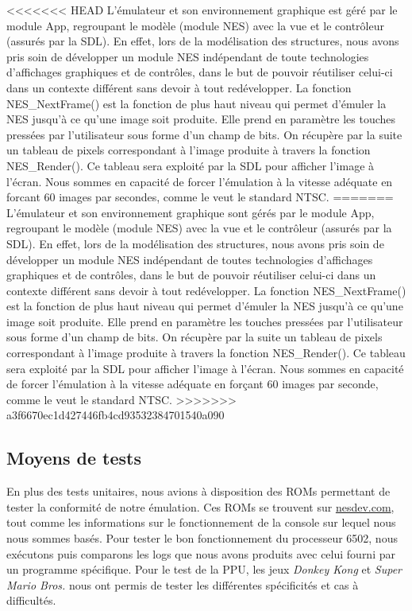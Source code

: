 <<<<<<< HEAD
L’émulateur et son environnement graphique est géré par le module App, regroupant le modèle (module NES) avec la vue et le contrôleur (assurés par la SDL). En effet, lors de la modélisation des structures, nous avons pris soin de développer un module NES indépendant de toute technologies d'affichages graphiques et de contrôles, dans le but de pouvoir réutiliser celui-ci dans un contexte différent sans devoir à tout redévelopper. La fonction NES\_NextFrame() est la fonction de plus haut niveau qui permet d'émuler la NES jusqu’à ce qu'une image soit produite. Elle prend en paramètre les touches pressées par l'utilisateur sous forme d'un champ de bits. On récupère par la suite un tableau de pixels correspondant à l'image produite à travers la fonction NES\_Render(). Ce tableau sera exploité par la SDL pour afficher l'image à l'écran. Nous sommes en capacité de forcer l'émulation à la vitesse adéquate en forcant 60 images par secondes, comme le veut le standard NTSC.
=======
L’émulateur et son environnement graphique sont gérés par le module App, regroupant le modèle (module NES) avec la vue et le contrôleur (assurés par la SDL). En effet, lors de la modélisation des structures, nous avons pris soin de développer un module NES indépendant de toutes technologies d'affichages graphiques et de contrôles, dans le but de pouvoir réutiliser celui-ci dans un contexte différent sans devoir à tout redévelopper. La fonction NES\_NextFrame() est la fonction de plus haut niveau qui permet d'émuler la NES jusqu’à ce qu'une image soit produite. Elle prend en paramètre les touches pressées par l'utilisateur sous forme d'un champ de bits. On récupère par la suite un tableau de pixels correspondant à l'image produite à travers la fonction NES\_Render(). Ce tableau sera exploité par la SDL pour afficher l'image à l'écran. Nous sommes en capacité de forcer l'émulation à la vitesse adéquate en forçant 60 images par seconde, comme le veut le standard NTSC.
>>>>>>> a3f6670ec1d427446fb4cd93532384701540a090

\subsection{Moyens de tests}

En plus des tests unitaires, nous avions à disposition des ROMs permettant de tester la conformité de notre émulation. Ces ROMs se trouvent sur \url{nesdev.com}, tout comme les informations sur le fonctionnement de la console sur lequel nous nous sommes basés. Pour tester le bon fonctionnement du processeur 6502, nous exécutons puis comparons les logs que nous avons produits avec celui fourni par un programme spécifique. Pour le test de la PPU, les jeux \emph{Donkey Kong} et \emph{Super Mario Bros.} nous ont permis de tester les différentes spécificités et cas à difficultés.
